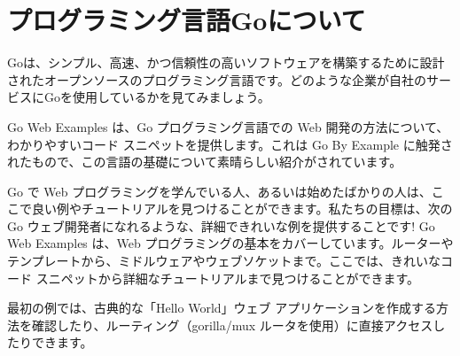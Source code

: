 \section{プログラミング言語Goについて}

Goは、シンプル、高速、かつ信頼性の高いソフトウェアを構築するために設計されたオープンソースのプログラミング言語です。どのような企業が自社のサービスにGoを使用しているかを見てみましょう。

Go Web Examples は、Go プログラミング言語での Web 開発の方法について、わかりやすいコード スニペットを提供します。これは Go By Example に触発されたもので、この言語の基礎について素晴らしい紹介がされています。

Go で Web プログラミングを学んでいる人、あるいは始めたばかりの人は、ここで良い例やチュートリアルを見つけることができます。私たちの目標は、次の Go ウェブ開発者になれるような、詳細できれいな例を提供することです! Go Web Examples は、Web プログラミングの基本をカバーしています。ルーターやテンプレートから、ミドルウェアやウェブソケットまで。ここでは、きれいなコード スニペットから詳細なチュートリアルまで見つけることができます。

最初の例では、古典的な「Hello World」ウェブ アプリケーションを作成する方法を確認したり、ルーティング（gorilla/mux ルータを使用）に直接アクセスしたりできます。

